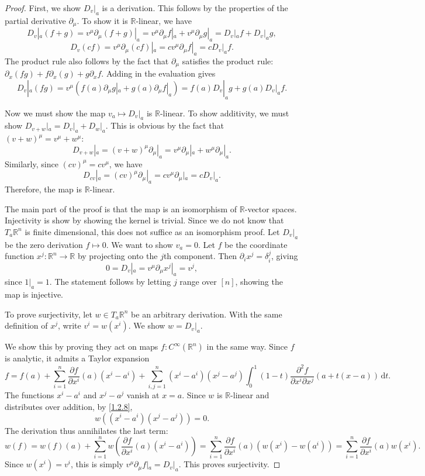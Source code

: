 \begin{proof}
	First, we show $D_v|_a$ is a derivation. This follows by the properties of the partial derivative $\partial _\mu $. To show it is $\mathbb{R} $-linear, we have
	\[
		D_v|_a(f+g)=v^\mu \partial _\mu (f+g)|_a=v^\mu \partial _\mu f|_a+v^\mu \partial _\mu g|_a=D_v|_af+D_v|_ag,
	\]
	\[
		D_v(cf)=v^\mu \partial _\mu (cf)|_a=cv^\mu \partial _\mu f|_a=cD_v|_af
	.\]
	The product rule also follows by the fact that $\partial _\mu $ satisfies the product rule: $\partial _x(fg)+f \partial _x(g)+g \partial _xf$. Adding in the evaluation gives
	\[
	D_v|_a(fg)=v^\mu \left( f(a)\partial _\mu g|_a+g(a)\partial _\mu f|_a \right) =f(a)D_v|_ag+g(a)D_v|_af
	.\]
	
	Now we must show the map $v_a\mapsto D_v|_a$ is $\mathbb{R} $-linear. To show additivity, we must show $D_{v+w} |_a=D_v|_a+D_w|_a$. This is obvious by the fact that $(v+w)^\mu =v^\mu +w^\mu $:
	\[
		D_{v+w} |_a=(v+w)^\mu \partial _\mu |_a=v^\mu \partial _\mu |_a+w^\mu \partial _\mu |_a
	.\]
	Similarly, since $(cv)^\mu =cv^\mu $, we have
	\[
		D_{cv} |_a=(cv)^\mu \partial _\mu |_a=cv^\mu \partial _\mu |_a=cD_v|_a
	.\]
	Therefore, the map is $\mathbb{R} $-linear.

	The main part of the proof is that the map is an isomorphism of $\mathbb{R} $-vector spaces. Injectivity is show by showing the kernel is trivial. Since we do not know that $T_a\mathbb{R} ^n$ is finite dimensional, this does not suffice as an isomorphism proof. Let $D_v|_a$ be the zero derivation $f\mapsto 0$. We want to show $v_a=0$. Let $f$ be the coordinate function $x^j : \mathbb{R} ^n \to \mathbb{R} $ by projecting onto the $j$th component. Then $\partial _ix^j=\delta_i^j$, giving
	\[
		0 = D_v|_a = v^\mu \partial _\mu x^j|_a=v^j ,
	\]
	since $1|_a=1$. The statement follows by letting $j$ range over $[n]$, showing the map is injective.

	To prove surjectivity, let $w\in T_a\mathbb{R} ^n$ be an arbitrary derivation. With the same definition of $x^j$, write $v^i=w(x^i)$. We show $w=D_v|_a$.

	We show this by proving they act on maps $f : C^\infty (\mathbb{R} ^n)$ in the same way. Since $f$ is analytic, it admits a Taylor expansion
	\[
		f=f(a)+\sum_{i=1}^{n} \frac{\partial f}{\partial x^i} (a)\left( x^i-a^i \right) +\sum_{i,j=1}^{n} \left( x^i-a^i \right) \left( x^j-a^j \right) \int_{0}^{1} (1-t)\frac{\partial ^2f}{\partial x^i \partial x^j} (a+t(x-a)) \,\mathrm{d} t
	.\]
	The functions $x^i-a^i$ and $x^j-a^j$ vanish at $x=a$. Since $w$ is $\mathbb{R} $-linear and distributes over addition, by \cref{1.2.8},
	\[
		w((x^i-a^i)(x^j-a^j))=0
	.\]
	The derivation thus annihilates the last term:
	\[
		w(f)=w(f)(a)+\sum_{i=1}^{n} w\left( \frac{\partial f}{\partial x^i} (a)\left( x^i-a^i \right)  \right) =\sum_{i=1}^{n} \frac{\partial f}{\partial x^i} (a)\left( w(x^i)-w(a^i) \right) =\sum_{i=1}^{n} \frac{\partial f}{\partial x^i} (a)w(x^i)
	.\]
	Since $w(x^i)=v^i$, this is simply $v^\mu \partial _\mu f|_a=D_v|_a$. This proves surjectivity.
\end{proof}

